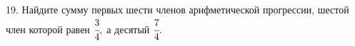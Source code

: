 19. Найдите сумму первых шести членов арифметической прогрессии, шестой член которой равен $\cfrac{3}{4},$ а десятый $\cfrac{7}{4}.$\\
